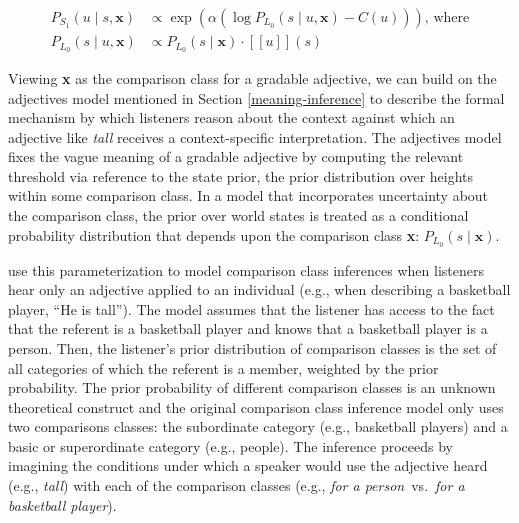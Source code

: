 \documentclass{sp}
\newcommand{\sem}[1]{\ensuremath{[\![#1]\!]}}
\begin{document}
\begin{align} \label{S1-context}
P_{S_1}(u\mid s, \textbf{x}) & \propto \exp (\alpha (\log P_{L_0}(s \mid u, \textbf{x}) - C(u)))\text{, where} \\
  P_{L_0}(s \mid u, \textbf{x}) & \propto P_{L_0}(s \mid \textbf{x})  \cdot \sem{u}(s) \nonumber
\end{align}

Viewing \textbf{x} as the comparison class for a gradable adjective, we can build on the \citeauthor{lassitergoodman2013} adjectives model mentioned in Section \ref{meaning-inference} to describe the formal mechanism by which listeners reason about the context against which an adjective like \emph{tall} receives a context-specific interpretation. The adjectives model fixes the vague meaning of a gradable adjective by computing the relevant threshold via reference to the state prior, the prior distribution over heights within some comparison class. In a model that incorporates uncertainty about the comparison class, the prior over world states is treated as a conditional probability distribution that depends upon the comparison class \textbf{x}: $P_{L_0}(s\mid \textbf{x})$.


\cite{tessler2017comparisonclass} use this parameterization to model comparison class inferences when listeners hear only an adjective applied to an individual (e.g., when describing a basketball player, ``He is tall'').
The model assumes that the listener has access to the fact that the referent is a basketball player and knows that a basketball player is a person. Then, the listener's prior distribution of comparison classes is the set of all categories of which the referent is a member, weighted by the prior probability. The prior probability of different comparison classes is an unknown theoretical construct and the original comparison class inference model only uses two comparisons classes: the subordinate category (e.g., basketball players) and a basic or superordinate category (e.g., people). The inference proceeds by imagining the conditions under which a speaker would use the adjective heard (e.g., \emph{tall}) with each of the comparison classes (e.g., \emph{for a person}~vs.~\emph{for a basketball player}).
\end{document}

